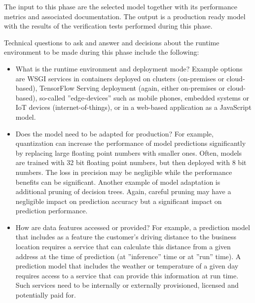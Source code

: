The input to this phase are the selected model together with its performance metrics and associated documentation. The output is a production ready model with the results of the verification tests performed during this phase. 

Technical questions to ask and answer and decisions about the runtime environment to be made during this phase include the following:
\begin{itemize}
   \item What is the runtime environment and deployment mode? Example options are WSGI services in containers deployed on clusters (on-premises or cloud-based), TensorFlow Serving deployment (again, either on-premises or cloud-based), so-called ''edge-devices'' such as mobile phones, embedded systems or IoT devices (internet-of-things), or in a web-based application as a JavaScript model.
   \item Does the model need to be adapted for production? For example, quantization can increase the performance of model predictions significantly by replacing large floating point numbers with smaller ones. Often, models are trained with 32 bit floating point numbers, but then deployed with 8 bit numbers. The loss in precision may be negligible while the performance benefits can be significant. Another example of model adaptation is additional pruning of decision trees. Again, careful pruning may have a negligible impact on prediction accuracy but a significant impact on prediction performance. 
   \item How are data features accessed or provided? For example, a prediction model that includes as a feature the customer's driving distance to the business location requires a service that can calculate this distance from a given address at the time of prediction (at ''inference'' time or at ''run'' time). A prediction model that includes the weather or temperature of a given day requires access to a service that can provide this information at run time. Such services need to be internally or externally provisioned, licensed and potentially paid for. 
\end{itemize}

